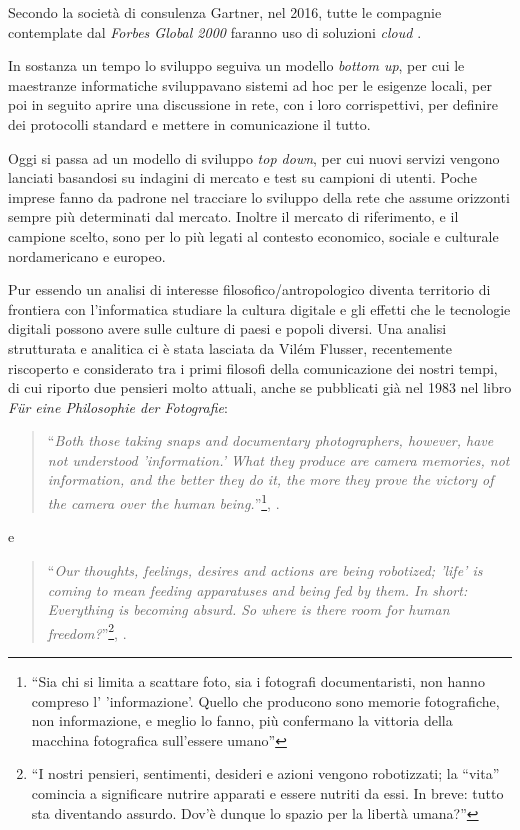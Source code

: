 Secondo la società di consulenza Gartner, nel 2016, tutte le compagnie
contemplate dal \emph{Forbes Global 2000} faranno uso di soluzioni
\emph{cloud} \citep{EY2011}.

In sostanza un tempo lo sviluppo seguiva un modello \emph{bottom up}, per
cui le maestranze informatiche sviluppavano sistemi ad hoc per le
esigenze locali, per poi in seguito aprire una discussione in rete,
con i loro corrispettivi, per definire dei protocolli standard e
mettere in comunicazione il tutto.

Oggi si passa ad un modello di sviluppo \emph{top down}, per cui nuovi
servizi vengono lanciati basandosi su indagini di mercato e test su
campioni di utenti. Poche imprese fanno da padrone nel tracciare lo
sviluppo della rete che assume orizzonti sempre più determinati dal
mercato. Inoltre il mercato di riferimento, e il campione scelto, sono
per lo più legati al contesto economico, sociale e culturale
nordamericano e europeo. 

Pur essendo un analisi di interesse filosofico/antropologico diventa
territorio di frontiera con l'informatica studiare la cultura digitale
e gli effetti che le tecnologie digitali possono avere sulle culture
di paesi e popoli diversi. Una analisi strutturata e analitica ci è
stata lasciata da Vilém Flusser, recentemente riscoperto e considerato
tra i primi filosofi della comunicazione dei nostri tempi, di cui
riporto due pensieri molto attuali, anche se pubblicati già nel 1983
nel libro \emph{F{\"u}r eine Philosophie der Fotografie}:

\begin{quote}
  ``\emph{Both those taking snaps and documentary photographers, however,
  have not understood 'information.' What they produce are camera
  memories, not information, and the better they do it, the more they
  prove the victory of the camera over the human
  being.}''\footnote{``Sia chi si limita a scattare foto, sia i fotografi
documentaristi, non hanno compreso l' 'informazione'. Quello che
producono sono memorie fotografiche, non informazione, e meglio lo
fanno, più confermano la vittoria della macchina fotografica
sull'essere umano''}, \citet{flusser1983philosophie}.
\end{quote}

e 

\begin{quote}
  ``\emph{Our thoughts, feelings, desires and actions are being
    robotized; 'life' is coming to mean feeding apparatuses and being
    fed by them. In short: Everything is becoming absurd. So where is
    there room for human freedom?}''\footnote{``I nostri pensieri,
    sentimenti, desideri e azioni vengono robotizzati; la ``vita''
    comincia a significare nutrire apparati e essere nutriti da
    essi. In breve: tutto sta diventando assurdo. Dov'è dunque lo
    spazio per la libertà umana?''}, \citet{flusser1983philosophie}.
\end{quote}

